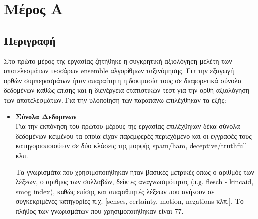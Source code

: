 \section{Μέρος Α}
\subsection{Περιγραφή}
Στο πρώτο μέρος της εργασίας ζητήθηκε η συγκρητική αξιολόγηση μελέτη των αποτελεσμάτων τεσσάρων
ensemble αλγορίθμων ταξινόμησης. Για την εξαγωγή ορθών συμπερασμάτων ήταν απαραίτητη η δοκιμασία τους σε διαφορετικά σύνολα δεδομένων καθώς επίσης και η διενέργεια στατιστικών τεστ για την ορθή αξιολόγηση των αποτελεσμάτων. Για την υλοποίηση των παραπάνω επιλέχθηκαν τα εξής:

\begin{itemize}
	\item \textbf{Σύνολα Δεδομένων} \\
	Για την εκπόνηση του πρώτου μέρους της εργασίας επιλέχθηκαν δέκα σύνολα δεδομένων κειμένου
	τα οποία είχαν παρεμφερές περιεχόμενο και οι εγγραφές τους κατηγοριοποιούταν σε δύο κλάσεις της μορφής spam/ham, deceptive/truthfull κλπ. 
	
	Τα γνωρισμάτα που χρησιμοποιήθηκαν ήταν βασικές μετρικές όπως ο αριθμός των λέξεων, ο αριθμός των συλλαβών, δείκτες αναγνωσιμότητας (π.χ. flesch - kincaid, smog index), καθώς επίσης και απαριθμητές λέξεων που 
	ανήκουν σε συγκεκριμένες κατηγορίες π.χ. [senses, certainty, motion, negations κλπ.]. Το πλήθος των γνωρισμάτων που χρησιμοποιήθηκαν είναι 77. 
	

\end{itemize}
